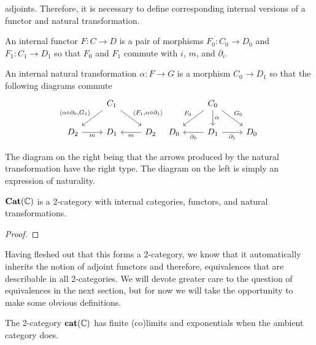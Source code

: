 adjoints. Therefore, it is necessary to define corresponding internal
versions of a functor and natural transformation.
\begin{defn}\label{defn:internal:functor}
  An internal functor $F : C \to D$ is a pair of morphisms
  $F_0 : C_0 \to D_0$ and $F_1 : C_1 \to D_1$ so that $F_0$ and $F_1$
  commute with $i$, $m$, and $\partial_i$.
\end{defn}
\begin{defn}\label{defn:internal:naturaltrans}
  An internal natural transformation $\alpha : F \to G$ is a morphism
  $C_0 \to D_1$ so that the following diagrams commute
  \[
    \begin{tikzcd}
      &C_1 \ar[dl, swap, "{\langle \alpha \circ \partial_0, G_1 \rangle}"]
           \ar[dr, "{\langle F_1, \alpha \circ \partial_1 \rangle}"]&\\
      D_2 \ar[r, swap, "m"] & D_1 & D_2 \ar[l, "m"]
    \end{tikzcd}
    \begin{tikzcd}
      &C_0 \ar[d, "\alpha"] \ar[dl, swap, "F_0"] \ar[dr, "G_0"]&\\
      D_0 & D_1 \ar[l, "\partial_0"] \ar[r, swap, "\partial_1"] & D_0
    \end{tikzcd}
  \]
\end{defn}
The diagram on the right being that the arrows produced by the
natural transformation have the right type. The diagram on the left
is simply an expression of naturality.
\begin{thm}
  $\mathbf{Cat}(\mathbb{C})$ is a 2-category with internal categories,
  functors, and natural transformations.
\end{thm}
\begin{proof}
\end{proof}
Having fleshed out that this forms a 2-category, we know that it
automatically inherits the notion of adjoint functors and therefore,
equivalences that are describable in all 2-categories. We will
devote greater care to the question of equivalences in the next
section, but for now we will take the opportunity to make some obvious
definitions.
\begin{thm}\label{thm:internal:2categorical}
  The 2-category $\mathbf{cat}(\mathbb{C})$ has finite (co)limits and
  exponentials when the ambient category does.
\end{thm}
